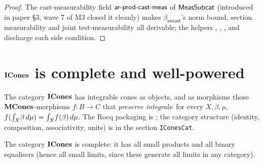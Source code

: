 \begin{proof}
The cast-measurability field $\mathsf{ar}\text{-}\mathsf{prod\text{-}cast\text{-}meas}$
of $\mathsf{MeasSubcat}$ (introduced in paper \S3, wave 7 of M3 closed it
cleanly) makes $\beta_{\!\mathsf{uncast}}$'s norm bound, section
measurability and joint test-measurability all derivable; the
helpers
,
,
,
 and
 discharge each side
condition.
\end{proof}

\section{\texorpdfstring{$\mathbf{ICones}$}{ICones} is complete and well-powered}\label{sec:icones-cat}

The category $\mathbf{ICones}$ has integrable cones as objects, and as
morphisms those $\mathbf{MCones}$-morphisms $f : B \to C$ that
\emph{preserve integrals}: for every $X, \beta, \mu$,
$f(\int_{X}\!\beta\,d\mu) = \int_{X}\!f(\beta)\,d\mu$. The
Rocq packaging is ; the
category structure (identity, composition, associativity, units) is
in the section \texttt{IConesCat}.

\begin{theorem}\label{thm:icones-complete}
The category $\mathbf{ICones}$ is complete: it has all small products and
all binary equalisers (hence all small limits, since these generate
all limits in any category).
\end{theorem}

